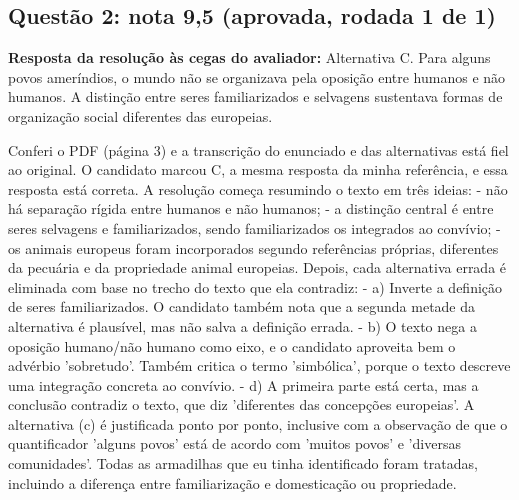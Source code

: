 \documentclass{article}%
\begin{document}
\subsection*{Questão 2: nota 9,5 (aprovada, rodada 1 de 1)}%
\textbf{Resposta da resolução às cegas do avaliador:} Alternativa C. Para alguns povos ameríndios, o mundo não se organizava pela oposição entre humanos e não humanos. A distinção entre seres familiarizados e selvagens sustentava formas de organização social diferentes das europeias.\par %
Conferi o PDF (página 3) e a transcrição do enunciado e das alternativas está fiel ao original. O candidato marcou C, a mesma resposta da minha referência, e essa resposta está correta.\newline%
\newline%
A resolução começa resumindo o texto em três ideias:\newline%
{-} não há separação rígida entre humanos e não humanos;\newline%
{-} a distinção central é entre seres selvagens e familiarizados, sendo familiarizados os integrados ao convívio;\newline%
{-} os animais europeus foram incorporados segundo referências próprias, diferentes da pecuária e da propriedade animal europeias.\newline%
\newline%
Depois, cada alternativa errada é eliminada com base no trecho do texto que ela contradiz:\newline%
{-} a) Inverte a definição de seres familiarizados. O candidato também nota que a segunda metade da alternativa é plausível, mas não salva a definição errada.\newline%
{-} b) O texto nega a oposição humano/não humano como eixo, e o candidato aproveita bem o advérbio 'sobretudo'. Também critica o termo 'simbólica', porque o texto descreve uma integração concreta ao convívio.\newline%
{-} d) A primeira parte está certa, mas a conclusão contradiz o texto, que diz 'diferentes das concepções europeias'.\newline%
\newline%
A alternativa (c) é justificada ponto por ponto, inclusive com a observação de que o quantificador 'alguns povos' está de acordo com 'muitos povos' e 'diversas comunidades'. Todas as armadilhas que eu tinha identificado foram tratadas, incluindo a diferença entre familiarização e domesticação ou propriedade.\newline%
\end{document}

